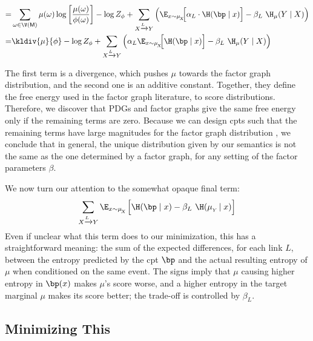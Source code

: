 \documentclass{article}
\newcommand{\sfM}{\mathsf M}
\newcommand{\alle}[1][L]{_{ X \xrightarrow{\!\!#1} Y }}
\newcommand{\ubrace}[3][blue]{\begingroup\color{#1} \vphantom{#2}\smash{\underbrace{\color{black}#2}_{#3}}\endgroup}
\begin{document}
\begin{align*}
%
		=& \sum_{\omega \in \V(\sfM)} \mu(\omega) \log \left[
			\frac{\mu(\omega)}{\phi(\omega)  } 	\right] - \log Z_\phi  + \sum\alle \left( \E_{x \sim \mu_{\!_X}}\!\! \Big[ \alpha_L \cdot  \H(\bp \mid x)\Big] - \beta_L \ \H_\mu(Y \mid X) \right) \\
		=& \kldiv{\mu}{\phi} - \log Z_\phi + \sum\alle \left( \alpha_L \E_{x \sim \mu_{\!_X}}\!\! \Big[  \H(\bp \mid x)\Big] - \beta_L \ \H_\mu(Y \mid X) \right)
	\end{align*}


	The first term is a divergence, which pushes $\mu$ towards the factor graph distribution, and the second one is an additive constant. Together, they define the free energy used in the factor graph literature, to score distributions. Therefore, we discover that PDGs and factor graphs give the same free energy only if the remaining terms are zero. Because we can design cpts such that the remaining terms have large magnitudes for the factor graph distribution , we conclude that in general, the unique distribution given by our semantics is not the same as the one determined by a factor graph, for any setting of the factor parameters $\beta$.


	We now turn our attention to the somewhat opaque final term:
	\[ \sum\alle \E_{x \sim \mu_{\!_X}} \Big[ \H(\bp \mid x) - \beta_L \ \H(\mu_{_Y}\! \mid x) \Big]
	  \]
	Even if unclear what this term does to our minimization, this has a straightforward meaning: the sum of the expected differences, for each link $L$, between the entropy predicted by the cpt $\bp$ and the actual resulting entropy of $\mu$ when conditioned on the same event.
	The signs imply that $\mu$ causing higher entropy in $\bp(x)$ makes $\mu$'s score worse, and a higher entropy in the target marginal $\mu$ makes its score better; the trade-off is controlled by $\beta_L$.

	\subsection{Minimizing This}
	\begingroup\color{gray!50!black}
\end{document}
